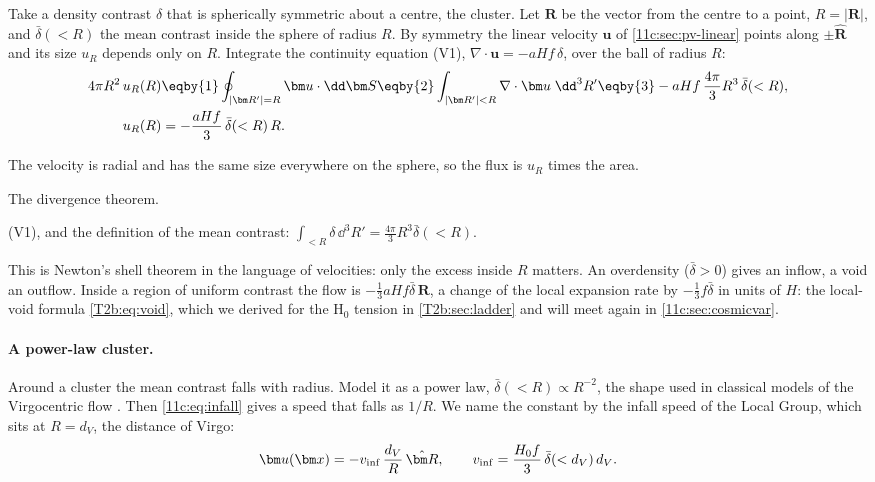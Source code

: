 Take a density contrast $\delta$ that is spherically symmetric about a centre, the
cluster. Let $\bm R$ be the vector from the centre to a point, $R=|\bm R|$, and
$\bar\delta(<R)$ the mean contrast inside the sphere of radius $R$. By symmetry the
linear velocity $\bm u$ of \cref{11c:sec:pv-linear} points along $\pm\hat{\bm R}$ and
its size $u_R$ depends only on $R$. Integrate the continuity equation (V1),
$\nabla\cdot\bm u=-aHf\,\delta$, over the ball of radius $R$:
\begin{align}
  4\pi R^2\,u_R(R)
  &\eqby{1}\oint_{|\bm R'|=R}\bm u\cdot\dd\bm S
   \eqby{2}\int_{|\bm R'|<R}\nabla\cdot\bm u\;\dd^3R'
   \eqby{3}-aHf\,\frac{4\pi}{3}R^3\,\bar\delta(<R),
  \nonumber\\
  u_R(R)
  &=-\frac{aHf}{3}\,\bar\delta(<R)\,R .
  \label{11c:eq:infall}
\end{align}
\begin{explain}
  \item The velocity is radial and has the same size everywhere on the sphere, so
        the flux is $u_R$ times the area.
  \item The divergence theorem.
  \item (V1), and the definition of the mean contrast:
        $\int_{<R}\delta\,\dd^3R'=\tfrac{4\pi}{3}R^3\bar\delta(<R)$.
\end{explain}
This is Newton's shell theorem in the language of velocities: only the excess
inside $R$ matters. An overdensity ($\bar\delta>0$) gives an inflow, a void an
outflow. Inside a region of uniform contrast the flow is $-\tfrac13aHf\bar\delta\,\bm R$,
a change of the local expansion rate by $-\tfrac13f\bar\delta$ in units of $H$: the
local-void formula \eqref{T2b:eq:void}, which we derived for the H$_0$ tension in
\cref{T2b:sec:ladder} and will meet again in \cref{11c:sec:cosmicvar}.

\paragraph{A power-law cluster.} Around a cluster the mean contrast falls with
radius. Model it as a power law, $\bar\delta(<R)\propto R^{-2}$, the shape used in
classical models of the Virgocentric flow \cite{Schechter1980}. Then
\eqref{11c:eq:infall} gives a speed that falls as $1/R$. We name the constant by
the infall speed of the Local Group, which sits at $R=d_V$, the distance of Virgo:
\begin{equation}
  \bm u(\bm x)=-v_{\rm inf}\,\frac{d_V}{R}\,\hat{\bm R},
  \qquad
  v_{\rm inf}=\frac{H_0f}{3}\,\bar\delta(<d_V)\,d_V .
  \label{11c:eq:virgo-model}
\end{equation}


